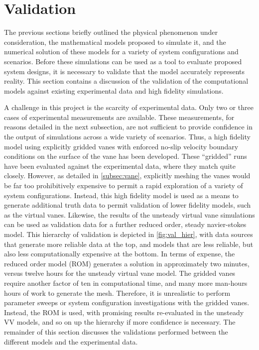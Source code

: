 
\section{Validation}
\label{sec:validation}

%
%
%

%
%

The previous sections briefly outlined the physical phenomenon under
consideration, the mathematical models proposed to simulate it,
and the numerical solution of these models for a variety of system 
configurations and scenarios. Before these simulations can be used 
as a tool to evaluate proposed system designs,
it is necessary to validate that the model accurately represents reality.  
This section contains a discussion of the validation of the computational models
against existing experimental data and high fidelity simulations.

A challenge in this project is the scarcity of experimental data. Only two or three cases of 
experimental measurements are available. These measurements, for reasons detailed in the next subsection, 
are not sufficient to provide confidence in the output of simulations across a wide variety 
of scenarios. Thus, a high fidelity model using explicitly gridded vanes with enforced no-slip 
velocity boundary conditions on the surface of the vane has been developed. These ``gridded'' runs have been
evaluated against the experimental data, where they match quite closely. However, as 
detailed in \ref{subsec:vane}, explicitly meshing the vanes would be far too prohibitively expensive to 
permit a rapid exploration of a variety of system configurations. Instead, this high fidelity model is used 
as a means to generate additional truth data to permit validation of lower fidelity models, such as the virtual vanes. 
Likewise, the results of the unsteady virtual vane simulations can be used as validation data for a further 
reduced order, steady navier-stokes model. This hierarchy of validation is depicted in \ref{fig:val_hier}, with 
data sources that generate more reliable data at the top, and models that are less reliable, but also 
less computationally expensive at the bottom. In terms of expense, the reduced order model (ROM) 
generates a solution in approximately two minutes, versus twelve hours for the unsteady virtual vane model. 
The gridded vanes require another factor of ten in computational time, and many more man-hours hours of work
to generate the mesh. Therefore, it is unrealistic to perform parameter sweeps or system configuration investigations
with the gridded vanes. Instead, the ROM is used, with promising results re-evaluated in the unsteady VV models, 
and so on up the hierarchy if more confidence is necessary. 
The remainder of this section discusses the validations performed between
the different models and the experimental data. 

